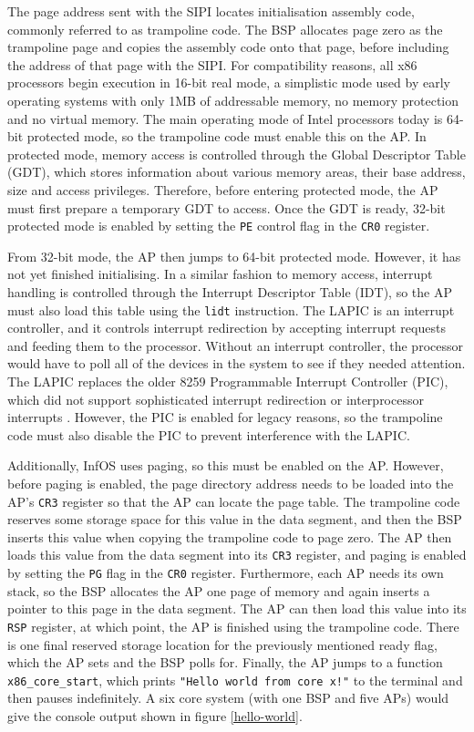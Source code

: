 \documentclass[bsc,frontabs,singlespacing,parskip,deptreport]{infthesis}
\begin{document}
The page address sent with the SIPI locates initialisation assembly code, commonly referred to as trampoline code. The BSP allocates page zero as the trampoline page and copies the assembly code onto that page, before including the address of that page with the SIPI. For compatibility reasons, all x86 processors begin execution in 16-bit real mode, a simplistic mode used by early operating systems with only 1MB of addressable memory, no memory protection and no virtual memory. The main operating mode of Intel processors today is 64-bit protected mode, so the trampoline code must enable this on the AP. In protected mode, memory access is controlled through the Global Descriptor Table (GDT), which stores information about various memory areas, their base address, size and access privileges. Therefore, before entering protected mode, the AP must first prepare a temporary GDT to access. Once the GDT is ready, 32-bit protected mode is enabled by setting the \verb|PE| control flag in the \verb|CR0| register. 

From 32-bit mode, the AP then jumps to 64-bit protected mode. However, it has not yet finished initialising. In a similar fashion to memory access, interrupt handling is controlled through the Interrupt Descriptor Table (IDT), so the AP must also load this table using the \verb|lidt| instruction. The LAPIC is an interrupt controller, and it controls interrupt redirection by accepting interrupt requests and feeding them to the processor. Without an interrupt controller, the processor would have to poll all of the devices in the system to see if they needed attention. The LAPIC replaces the older 8259 Programmable Interrupt Controller (PIC), which did not support sophisticated interrupt redirection or interprocessor interrupts \cite{osdev-apic}. However, the PIC is enabled for legacy reasons, so the trampoline code must also disable the PIC to prevent interference with the LAPIC. 

Additionally, InfOS uses paging, so this must be enabled on the AP. However, before paging is enabled, the page directory address needs to be loaded into the AP's \verb|CR3| register so that the AP can locate the page table. The trampoline code reserves some storage space for this value in the data segment, and then the BSP inserts this value when copying the trampoline code to page zero. The AP then loads this value from the data segment into its \verb|CR3| register, and paging is enabled by setting the \verb|PG| flag in the \verb|CR0| register. Furthermore, each AP needs its own stack, so the BSP allocates the AP one page of memory and again inserts a pointer to this page in the data segment. The AP can then load this value into its \verb|RSP| register, at which point, the AP is finished using the trampoline code. There is one final reserved storage location for the previously mentioned ready flag, which the AP sets and the BSP polls for. Finally, the AP jumps to a function \verb|x86_core_start|, which prints \verb|"Hello world from core x!"| to the terminal and then pauses indefinitely. A six core system (with one BSP and five APs) would give the console output shown in figure \ref{hello-world}.
\end{document}
